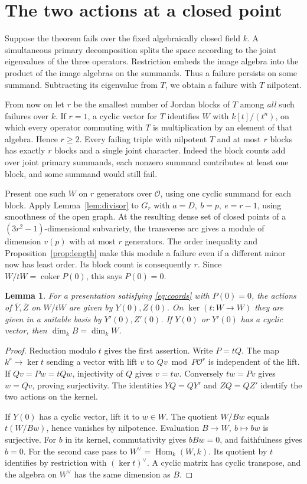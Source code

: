 \documentclass[11pt,reqno]{amsart}
\newtheorem{lemma}[theorem]{Lemma}
\theoremstyle{definition}
\newcommand{\Hom}{\operatorname{Hom}}
\newcommand{\coker}{\operatorname{coker}}
\newcommand{\OO}{\mathcal O}
\begin{document}
\section{The two actions at a closed point}\label{sec:ends}
Suppose the theorem fails over the fixed algebraically closed field \(k\).
A simultaneous primary decomposition splits the space according to the
joint eigenvalues of the three operators. Restriction embeds the image
algebra into the product of the image algebras on the summands. Thus a
failure persists on some summand. Subtracting its eigenvalue from \(T\),
we obtain a failure with \(T\) nilpotent.

From now on let \(r\) be the smallest number of Jordan blocks of \(T\)
among \emph{all} such failures over \(k\). If \(r=1\), a cyclic vector
for \(T\) identifies \(W\) with \(k[t]/(t^n)\), on which every operator commuting
with \(T\) is multiplication by an element of that algebra. Hence \(r\geq2\).
Every failing triple with nilpotent \(T\) and at most \(r\) blocks has
exactly \(r\) blocks and a single joint character. Indeed the block counts
add over joint primary summands, each nonzero summand contributes at least
one block, and some summand would still fail.

Present one such \(W\) on \(r\) generators over \(\OO\), using one cyclic
summand for each block. Apply Lemma~\ref{lem:divisor} to \(G_r\) with
\(a=D,\ b=p,\ e=r-1\), using smoothness of the open graph. At the resulting dense
set of closed points of a \((3r^2-1)\)-dimensional subvariety, the
transverse arc gives a module of dimension \(v(p)\) with at most \(r\)
generators. The order inequality and Proposition~\ref{prop:length} make
this module a failure even if a different minor now has least order.
Its block count is consequently \(r\). Since \(W/tW=\coker P(0)\),
this says \(P(0)=0\).

\begin{lemma}\label{lem:ends}
For a presentation satisfying \eqref{eq:coords} with \(P(0)=0\), the
actions of \(\bar Y,\bar Z\) on \(W/tW\) are given by \(Y(0),Z(0)\).
On \(\ker(t:W\to W)\) they are given in a suitable basis by
\(Y'(0),Z'(0)\). If \(Y(0)\) or \(Y'(0)\) has a cyclic vector, then
\(\dim_k B=\dim_k W\).
\end{lemma}
\begin{proof}
Reduction modulo \(t\) gives the first assertion. Write \(P=tQ\).
The map \(k^r\to\ker t\) sending a vector with lift \(v\) to
\(Qv\bmod P\OO^r\) is independent of the lift. If \(Qv=Pw=tQw\),
injectivity of \(Q\) gives \(v=tw\). Conversely \(tw=Pv\) gives
\(w=Qv\), proving surjectivity. The identities \(YQ=QY'\) and \(ZQ=QZ'\)
identify the two actions on the kernel.

If \(Y(0)\) has a cyclic vector, lift it to \(w\in W\). The quotient
\(W/Bw\) equals \(t(W/Bw)\), hence vanishes by nilpotence. Evaluation
\(B\to W,\ b\mapsto bw\) is surjective. For \(b\) in its kernel, commutativity gives
\(bBw=0\), and faithfulness gives \(b=0\). For the second case pass to
\(W^\vee=\Hom_k(W,k)\). Its quotient by \(t\) identifies by restriction
with \((\ker t)^\vee\). A cyclic matrix has cyclic transpose, and the
algebra on \(W^\vee\) has the same dimension as \(B\).
\end{proof}
\end{document}
